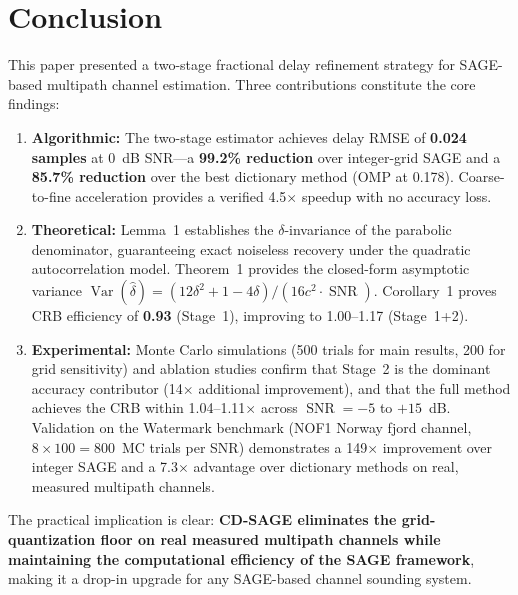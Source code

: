 \documentclass[journal]{IEEEtran}
\DeclareMathOperator{\Var}{Var}
\DeclareMathOperator{\SNR}{SNR}
\begin{document}
\section{Conclusion}
\label{sec:conclusion}

This paper presented a two-stage fractional delay refinement strategy for SAGE-based multipath channel estimation. Three contributions constitute the core findings:

\begin{enumerate}
\item \textbf{Algorithmic:} The two-stage estimator achieves delay RMSE of \textbf{0.024 samples} at 0~dB SNR---a \textbf{99.2\% reduction} over integer-grid SAGE and a \textbf{85.7\% reduction} over the best dictionary method (OMP at 0.178). Coarse-to-fine acceleration provides a verified 4.5$\times$ speedup with no accuracy loss.

\item \textbf{Theoretical:} Lemma~1 establishes the $\delta$-invariance of the parabolic denominator, guaranteeing exact noiseless recovery under the quadratic autocorrelation model. Theorem~1 provides the closed-form asymptotic variance $\Var(\hat{\delta}) = (12\delta^2+1-4\delta)/(16c^2 \cdot \SNR)$. Corollary~1 proves CRB efficiency of \textbf{0.93} (Stage~1), improving to 1.00--1.17 (Stage~1+2).

\item \textbf{Experimental:} Monte Carlo simulations (500 trials for main results, 200 for grid sensitivity) and ablation studies confirm that Stage~2 is the dominant accuracy contributor (14$\times$ additional improvement), and that the full method achieves the CRB within 1.04--1.11$\times$ across $\SNR = -5$ to $+15$~dB. Validation on the Watermark benchmark (NOF1 Norway fjord channel, $8\times100 = 800$~MC trials per SNR) demonstrates a 149$\times$ improvement over integer SAGE and a 7.3$\times$ advantage over dictionary methods on real, measured multipath channels.
\end{enumerate}

The practical implication is clear: \textbf{CD-SAGE eliminates the grid-quantization floor on real measured multipath channels while maintaining the computational efficiency of the SAGE framework}, making it a drop-in upgrade for any SAGE-based channel sounding system.
\end{document}

